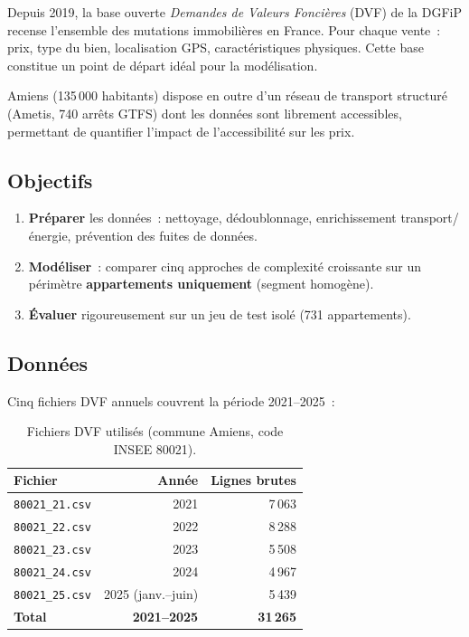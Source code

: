 \documentclass[12pt,a4paper]{article}
\begin{document}
Depuis 2019, la base ouverte \textit{Demandes de Valeurs Fonci\`eres} (DVF) de la DGFiP recense l'ensemble des mutations immobili\`eres en France. Pour chaque vente~: prix, type du bien, localisation GPS, caract\'eristiques physiques. Cette base constitue un point de d\'epart id\'eal pour la mod\'elisation.

Amiens (135\,000 habitants) dispose en outre d'un r\'eseau de transport structur\'e (Ametis, 740 arr\^ets GTFS) dont les donn\'ees sont librement accessibles, permettant de quantifier l'impact de l'accessibilit\'e sur les prix.

\subsection{Objectifs}

\begin{enumerate}
    \item \textbf{Pr\'eparer} les donn\'ees~: nettoyage, d\'edoublonnage, enrichissement transport/\'energie, pr\'evention des fuites de donn\'ees.
    \item \textbf{Mod\'eliser}~: comparer cinq approches de complexit\'e croissante sur un p\'erim\`etre \textbf{appartements uniquement} (segment homog\`ene).
    \item \textbf{\'Evaluer} rigoureusement sur un jeu de test isol\'e (731 appartements).
\end{enumerate}

\subsection{Donn\'ees}

Cinq fichiers DVF annuels couvrent la p\'eriode 2021--2025~:

\begin{table}[H]
\centering
\caption{Fichiers DVF utilis\'es (commune Amiens, code INSEE 80021).}
\label{tab:fichiers}
\small
\begin{tabular}{lrr}
\toprule
\textbf{Fichier} & \textbf{Ann\'ee} & \textbf{Lignes brutes} \\
\midrule
\texttt{80021\_21.csv} & 2021 & 7\,063 \\
\texttt{80021\_22.csv} & 2022 & 8\,288 \\
\texttt{80021\_23.csv} & 2023 & 5\,508 \\
\texttt{80021\_24.csv} & 2024 & 4\,967 \\
\texttt{80021\_25.csv} & 2025 (janv.--juin) & 5\,439 \\
\midrule
\textbf{Total} & \textbf{2021--2025} & \textbf{31\,265} \\
\bottomrule
\end{tabular}
\end{table}
\end{document}
